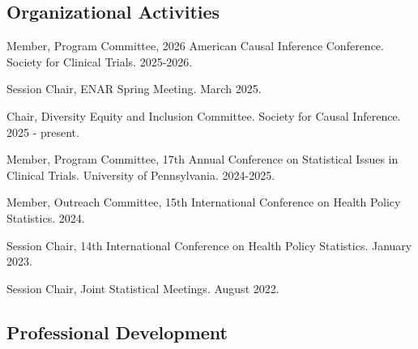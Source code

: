 \documentclass[letterpaper,11pt]{article} %
\begin{document}
    \subsection*{Organizational Activities}
    \begin{etaremune}
        \item Member, Program Committee, 2026 American Causal Inference Conference. Society for Clinical Trials. 2025-2026.
        \item Session Chair, ENAR Spring Meeting. March 2025.
        \item Chair, Diversity Equity and Inclusion Committee. Society for Causal Inference. 2025 - present.
        \item Member, Program Committee, 17th Annual Conference on Statistical Issues in Clinical Trials. University of Pennsylvania. 2024-2025.
        \item Member, Outreach Committee, 15th International Conference on Health Policy Statistics. 2024.
        \item Session Chair, 14th International Conference on Health Policy Statistics. January 2023.
        \item Session Chair, Joint Statistical Meetings. August 2022.
    \end{etaremune}

	\subsection*{Professional Development}
	
\end{document}
